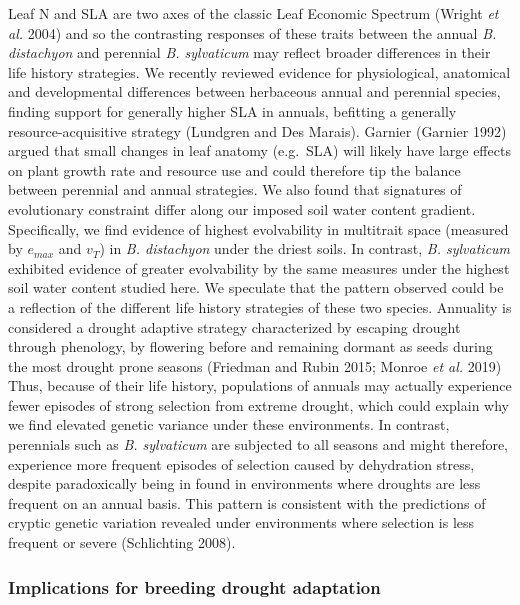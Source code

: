 \documentclass[jou,floatsintext]{apa6}
\begin{document}
Leaf N and SLA are two axes of the classic Leaf Economic Spectrum (Wright \emph{et al.} 2004) and so the contrasting responses of these traits between the annual \emph{B. distachyon} and perennial \emph{B. sylvaticum} may reflect broader differences in their life history strategies. We recently reviewed evidence for physiological, anatomical and developmental differences between herbaceous annual and perennial species, finding support for generally higher SLA in annuals, befitting a generally resource-acquisitive strategy (Lundgren and Des Marais). Garnier (Garnier 1992) argued that small changes in leaf anatomy (e.g.~SLA) will likely have large effects on plant growth rate and resource use and could therefore tip the balance between perennial and annual strategies.
We also found that signatures of evolutionary constraint differ along our imposed soil water content gradient. Specifically, we find evidence of highest evolvability in multitrait space (measured by \(e_{max}\) and \(v_T\)) in \emph{B. distachyon} under the driest soils. In contrast, \emph{B. sylvaticum} exhibited evidence of greater evolvability by the same measures under the highest soil water content studied here. We speculate that the pattern observed could be a reflection of the different life history strategies of these two species. Annuality is considered a drought adaptive strategy characterized by escaping drought through phenology, by flowering before and remaining dormant as seeds during the most drought prone seasons (Friedman and Rubin 2015; Monroe \emph{et al.} 2019) Thus, because of their life history, populations of annuals may actually experience fewer episodes of strong selection from extreme drought, which could explain why we find elevated genetic variance under these environments. In contrast, perennials such as \emph{B. sylvaticum} are subjected to all seasons and might therefore, experience more frequent episodes of selection caused by dehydration stress, despite paradoxically being in found in environments where droughts are less frequent on an annual basis. This pattern is consistent with the predictions of cryptic genetic variation revealed under environments where selection is less frequent or severe (Schlichting 2008).

\hypertarget{implications-for-breeding-drought-adaptation}{%
\subsubsection{Implications for breeding drought adaptation}\label{implications-for-breeding-drought-adaptation}}
\end{document}
